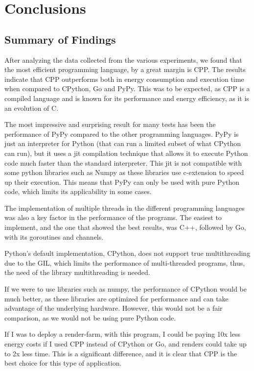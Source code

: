 \chapter{Conclusions}\label{chap:conclusions}


\section{Summary of Findings}
After analyzing the data collected from the various experiments, we found that the most efficient programming language, by a great margin is \gls{CPP}. The results indicate that \gls{CPP} outperforms both in energy consumption and execution time when compared to \gls{CPython}, Go and PyPy. This was to be expected, as \gls{CPP} is a compiled language and is known for its performance and energy efficiency, as it is an evolution of C.

The most impressive and surprising result for many tests has been the performance of PyPy compared to the other programming languages. PyPy is just an interpreter for Python (that can run a limited subset of what \gls{CPython} can run), but it uses a \gls{jit} compilation technique that allows it to execute Python code much faster than the standard interpreter. This \gls{jit} is not compatible with some python libraries such as Numpy \cite{numpy} as these libraries use \gls{c-extension} to speed up their execution. This means that PyPy can only be used with pure Python code, which limits its applicability in some cases.

The implementation of multiple threads in the different programming languages was also a key factor in the performance of the programs. The easiest to implement, and the one that showed the best results, was C++, followed by Go, with its \glspl{goroutine} and \glspl{channel}. 

Python's default implementation, \gls{CPython}, does not support true multithreading due to the \gls{GIL}, which limits the performance of multi-threaded programs, thus, the need of the library multithreading is needed.

If we were to use libraries such as \Gls{numpy}, the performance of \gls{CPython} would be much better, as these libraries are optimized for performance and can take advantage of the underlying hardware. However, this would not be a fair comparison, as we would not be using pure Python code.

If I was to deploy a render-farm, with this program, I could be paying 10x less energy costs if I used \gls{CPP} instead of \gls{CPython} or Go, and renders could take up to 2x less time. This is a significant difference, and it is clear that \gls{CPP} is the best choice for this type of application.

